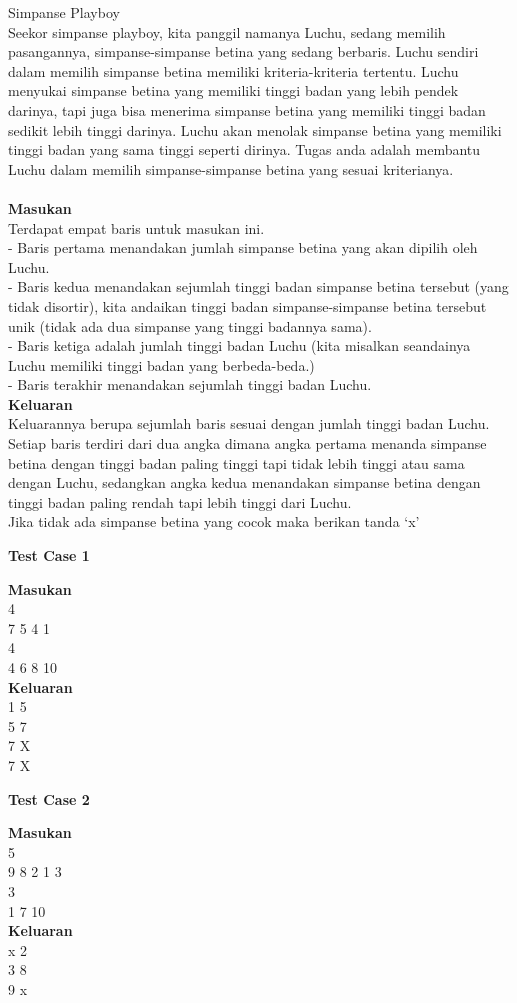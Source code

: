 \begin{permasalahan}{Simpanse Playboy}\\
Seekor simpanse playboy, kita panggil namanya Luchu, sedang memilih pasangannya, simpanse-simpanse betina yang sedang berbaris. Luchu sendiri dalam memilih simpanse betina memiliki kriteria-kriteria tertentu. Luchu menyukai simpanse betina yang memiliki tinggi badan yang lebih pendek darinya, tapi juga bisa menerima simpanse betina yang memiliki tinggi badan sedikit lebih tinggi darinya. Luchu akan menolak simpanse betina yang memiliki tinggi badan yang sama tinggi seperti dirinya. Tugas anda adalah membantu Luchu dalam memilih simpanse-simpanse betina yang sesuai kriterianya.\\
	\\
	\textbf{Masukan}\\
	Terdapat empat baris untuk masukan ini.\\
	- Baris pertama menandakan jumlah simpanse betina yang akan dipilih oleh Luchu.\\
	- Baris kedua menandakan sejumlah tinggi badan simpanse betina tersebut (yang tidak disortir), kita andaikan tinggi badan simpanse-simpanse betina tersebut unik (tidak ada dua simpanse yang tinggi badannya sama).\\
	- Baris ketiga adalah jumlah tinggi badan Luchu (kita misalkan seandainya Luchu memiliki tinggi badan yang berbeda-beda.)\\
	- Baris terakhir menandakan sejumlah tinggi badan Luchu.\\
	\textbf{Keluaran}\\
	Keluarannya berupa sejumlah baris sesuai dengan jumlah tinggi badan Luchu. Setiap baris terdiri dari dua angka dimana angka pertama menanda simpanse betina dengan tinggi badan paling tinggi tapi tidak lebih tinggi atau sama dengan Luchu, sedangkan angka kedua menandakan simpanse betina dengan tinggi badan paling rendah tapi lebih tinggi dari Luchu.\\
	Jika tidak ada simpanse betina yang cocok maka berikan tanda `x'\\
	\begin{center}
	\textbf{Test Case 1}\\
	\end{center}
	\textbf{Masukan}\\
	4\\
	7 5 4 1\\
	4\\
	4 6 8 10\\
	\textbf{Keluaran}\\
	1 5\\
	5 7\\
	7 X\\
	7 X\\
	\begin{center}
	\textbf{Test Case 2}\\
	\end{center}
	\textbf{Masukan}\\
	5\\
  9 8 2 1 3\\
	3\\
	1 7 10\\ 
	\textbf{Keluaran}\\
  x 2\\
  3 8\\
  9 x\\
\end{permasalahan}